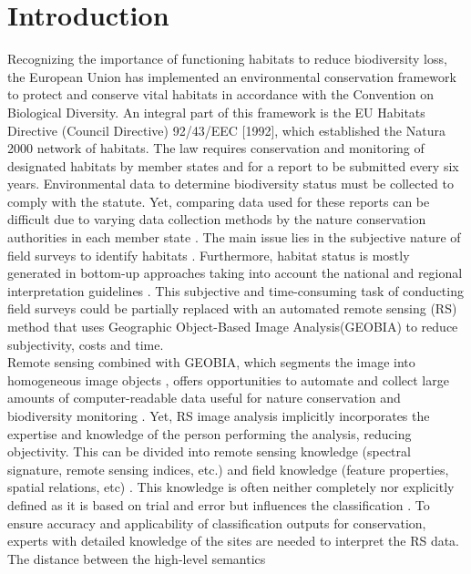 \documentclass[authoryear, review,12pt,number]{elsarticle}
\begin{document}
\section{Introduction}
Recognizing the importance of functioning habitats to reduce biodiversity loss, 
the European Union has implemented an environmental conservation framework to 
protect and conserve vital habitats in accordance with the Convention on 
Biological Diversity. An integral part of this framework is the EU 
Habitats Directive (Council Directive) 92/43/EEC [1992], which established the 
Natura 2000 network of habitats. The law requires conservation and monitoring 
of designated habitats by member states and for a report to be submitted every 
six years. Environmental data to determine biodiversity status must be 
collected to comply with the statute. Yet, comparing data used for these reports 
can be difficult due to varying data collection methods by the nature 
conservation authorities in each member state \citep{INSPIREdataspecs, INSPIRE}. 
The main issue lies in the subjective nature of field surveys to identify 
habitats \citep{Cherrill1999, Cherrill1999a, Hearn_2011, Nieland2015}. Furthermore, habitat 
status is mostly generated in bottom-up approaches taking into account the 
national and regional interpretation guidelines \citep{INSPIREdataspecs}. This 
subjective and time-consuming task of conducting field surveys could be 
partially replaced with an automated remote sensing (RS) method that uses  
Geographic Object-Based Image Analysis(GEOBIA) to reduce subjectivity, costs 
and time. 
\\
Remote sensing combined with GEOBIA, which segments the image into
homogeneous image objects \citep{Blaschke2010}, offers opportunities to automate
and collect large amounts of computer-readable data useful for nature
conservation and biodiversity monitoring \citep{Corbane2015, VandenBorre2011,
Mayer2011}. Yet, RS image analysis implicitly incorporates the expertise and
knowledge of the person performing the analysis, reducing objectivity. This can
be divided into remote sensing knowledge (spectral signature, remote sensing
indices, etc.) and field knowledge (feature properties, spatial relations, etc)
\citep{Andres2013a}. This knowledge is often neither completely nor explicitly
defined as it is based on trial and error but influences the classification
\citep{Arvor2013}. To ensure accuracy and applicability of classification
outputs for conservation, experts with detailed knowledge of the sites are
needed to interpret the RS data. The distance between the high-level semantics
\end{document}
